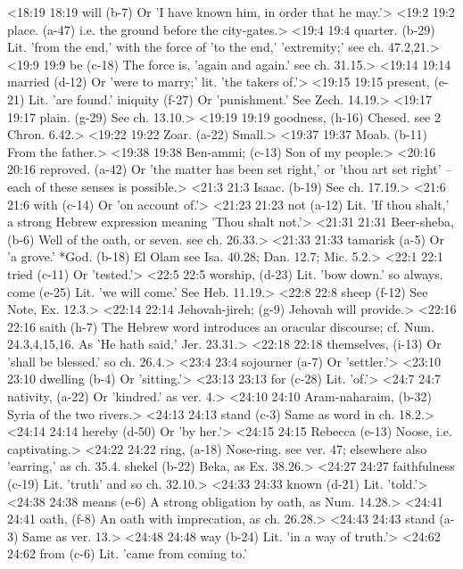 <18:19 18:19  will (b-7)  Or 'I have known him, in order that he may.'>
<19:2 19:2  place. (a-47)  i.e. the ground before the city-gates.>
<19:4 19:4  quarter. (b-29)  Lit. 'from the end,' with the force of 'to the end,'  'extremity;' see ch. 47.2,21.>
<19:9 19:9  be (c-18)  The force is, 'again and again.' see ch. 31.15.>
<19:14 19:14  married (d-12)  Or 'were to marry;' lit. 'the takers of.'>
<19:15 19:15  present, (e-21)  Lit. 'are found.'
  iniquity (f-27)  Or 'punishment.' See Zech. 14.19.>
<19:17 19:17  plain. (g-29)  See ch. 13.10.>
<19:19 19:19  goodness, (h-16)  Chesed. see 2 Chron. 6.42.>
<19:22 19:22  Zoar. (a-22)  Small.>
<19:37 19:37  Moab. (b-11)  From the father.>
<19:38 19:38  Ben-ammi; (c-13)  Son of my people.>
<20:16 20:16  reproved. (a-42)  Or 'the matter has been set right,' or 'thou art set right'  -- each of these senses is possible.>
<21:3 21:3  Isaac. (b-19)  See ch. 17.19.>
<21:6 21:6  with (c-14)  Or 'on account of.'>
<21:23 21:23  not (a-12)  Lit. 'If thou shalt,' a strong Hebrew expression meaning  'Thou shalt not.'>
<21:31 21:31  Beer-sheba, (b-6)  Well of the oath, or seven. see ch. 26.33.>
<21:33 21:33  tamarisk (a-5)  Or 'a grove.'
  *God. (b-18)  El Olam see Isa. 40.28; Dan. 12.7; Mic. 5.2.>
<22:1 22:1  tried (c-11)  Or 'tested.'>
<22:5 22:5  worship, (d-23)  Lit. 'bow down.' so always.
  come (e-25)  Lit. 'we will come.' See Heb. 11.19.>
<22:8 22:8  sheep (f-12)  See Note, Ex. 12.3.>
<22:14 22:14  Jehovah-jireh; (g-9)  Jehovah will provide.>
<22:16 22:16  saith (h-7)  The Hebrew word introduces an oracular discourse; cf. Num.  24.3,4,15,16. As 'He hath said,' Jer. 23.31.>
<22:18 22:18  themselves, (i-13)  Or 'shall be blessed.' so ch. 26.4.>
<23:4 23:4  sojourner (a-7)  Or 'settler.'>
<23:10 23:10  dwelling (b-4)  Or 'sitting.'>
<23:13 23:13  for (c-28)  Lit. 'of.'>
<24:7 24:7  nativity, (a-22)  Or 'kindred.' as ver. 4.>
<24:10 24:10  Aram-naharaim, (b-32)  Syria of the two rivers.>
<24:13 24:13  stand (c-3)  Same as word in ch. 18.2.>
<24:14 24:14  hereby (d-50)  Or 'by her.'>
<24:15 24:15  Rebecca (e-13)  Noose, i.e. captivating.>
<24:22 24:22  ring, (a-18)  Nose-ring. see ver. 47; elsewhere also 'earring,' as ch.  35.4.
  shekel (b-22)  Beka, as Ex. 38.26.>
<24:27 24:27  faithfulness (c-19)  Lit. 'truth' and so ch. 32.10.>
<24:33 24:33  known (d-21)  Lit. 'told.'>
<24:38 24:38  means (e-6)  A strong obligation by oath, as Num. 14.28.>
<24:41 24:41  oath, (f-8)  An oath with imprecation, as ch. 26.28.>
<24:43 24:43  stand (a-3)  Same as ver. 13.>
<24:48 24:48  way (b-24)  Lit. 'in a way of truth.'>
<24:62 24:62  from (c-6)  Lit. 'came from coming to.'
